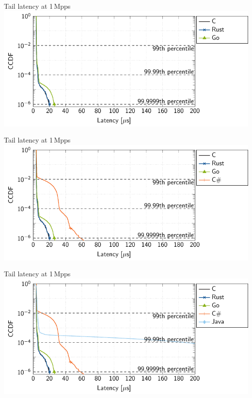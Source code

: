 \documentclass[NET,english,aspectratio=169,notitleframe]{tumbeamer}
\begin{document}
\begin{frame}{Tail latency at 1\,Mpps}
\hspace{1.7cm}\includegraphics[scale=1]{figures/latency-1/latency-ccdf-3.pdf}
\end{frame}
\addtocounter{framenumber}{-1}

\begin{frame}{Tail latency at 1\,Mpps}
\hspace{1.7cm}\includegraphics[scale=1]{figures/latency-1/latency-ccdf-4.pdf}
\end{frame}
\addtocounter{framenumber}{-1}

\begin{frame}{Tail latency at 1\,Mpps}
\hspace{1.7cm}\includegraphics[scale=1]{figures/latency-1/latency-ccdf-5.pdf}
\end{frame}
\addtocounter{framenumber}{-1}
\end{document}
